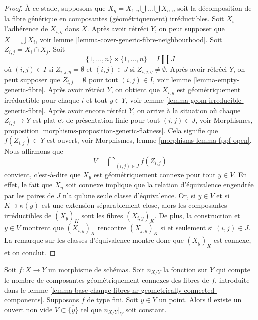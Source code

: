 \begin{proof}
\medskip\noindent
À ce stade, supposons que
$X_\eta = X_{1, \eta} \bigcup \ldots \bigcup X_{n, \eta}$
soit la décomposition de la fibre générique en composantes
(géométriquement) irréductibles.
Soit $X_i$ l'adhérence de $X_{i, \eta}$ dans $X$.
Après avoir rétréci $Y$, on peut supposer que
$X = \bigcup X_i$, voir
lemme \ref{lemma-cover-generic-fibre-neighbourhood}.
Soit $Z_{i, j} = X_i \cap X_j$.
Soit
$$
\{1, \ldots, n\} \times \{1, \ldots, n\} = I \amalg J
$$
où $(i, j) \in I$ si $Z_{i, j, \eta} = \emptyset$ et
$(i, j) \in J$ si $Z_{i, j, \eta} \not = \emptyset$.
Après avoir rétréci $Y$, on peut supposer que $Z_{i, j} = \emptyset$
pour tout $(i, j) \in I$, voir
lemme \ref{lemma-empty-generic-fibre}.
Après avoir rétréci $Y$, on obtient que $X_{i, y}$
est géométriquement irréductible pour chaque $i$ et tout $y \in Y$, voir
lemme \ref{lemma-geom-irreducible-generic-fibre}.
Après avoir encore rétréci $Y$, on arrive à la situation où
chaque $Z_{i, j} \to Y$ est plat et de présentation finie pour
tout $(i, j) \in J$, voir
Morphismes, proposition \ref{morphisms-proposition-generic-flatness}.
Cela signifie que $f(Z_{i, j}) \subset Y$ est ouvert, voir
Morphismes, lemme \ref{morphisms-lemma-fppf-open}.
Nous affirmons que
$$
V  = \bigcap\nolimits_{(i, j) \in J} f(Z_{i, j})
$$
convient, c'est-à-dire que $X_y$ est géométriquement connexe pour tout
$y \in V$. En effet, le fait que $X_\eta$ soit connexe implique que
la relation d'équivalence engendrée par les paires de $J$ n'a qu'une
seule classe d'équivalence. Or, si $y \in V$ et si $K \supset \kappa(y)$
est une extension séparablement close, alors les composantes irréductibles
de $(X_y)_K$ sont les fibres $(X_{i, y})_K$. De plus, la construction et
$y \in V$ montrent que $(X_{i, y})_K$ rencontre $(X_{j, y})_K$
si et seulement si $(i, j) \in J$. La remarque sur les classes d'équivalence
montre donc que $(X_y)_K$ est connexe, et on conclut.
\end{proof}

\begin{lemma}
\label{lemma-nr-geom-connected-components-good}
Soit $f : X \to Y$ un morphisme de schémas. Soit
$n_{X/Y}$ la fonction sur $Y$ qui compte le nombre de composantes
géométriquement connexes des fibres de $f$, introduite dans le
lemme \ref{lemma-base-change-fibres-nr-geometrically-connected-components}.
Supposons $f$ de type fini.
Soit $y \in Y$ un point. Alors il existe un ouvert non vide
$V \subset \overline{\{y\}}$ tel que $n_{X/Y}|_V$ soit constant.
\end{lemma}

